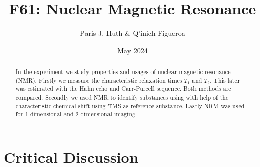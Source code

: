 \documentclass[11 pt]{article}
\title{F61: Nuclear Magnetic Resonance}
\author{Paris J. Huth \& Q'inich Figueroa}
\date{May 2024}
\begin{document}
\maketitle
\begin{center}
\begin{abstract}
In the experiment we study properties and usages of nuclear magnetic resonance (NMR). Firstly we measure the characteristic relaxation times $T_1$ and $T_2$. This later was estimated with the Hahn echo and Carr-Purcell sequence. Both methods are compared. Secondly we used NMR to identify substances using with help of the characteristic chemical shift using TMS as reference substance. Lastly NRM was used for 1 dimensional and 2 dimensional imaging.  
\end{abstract}
\end{center}




\section{Critical Discussion}
\end{document}
